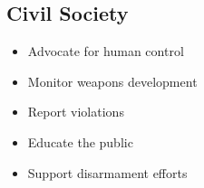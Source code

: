 \subsection{Civil Society}

\begin{itemize}
    \item Advocate for human control
    \item Monitor weapons development
    \item Report violations
    \item Educate the public
    \item Support disarmament efforts
\end{itemize}

\cleardoublepage
